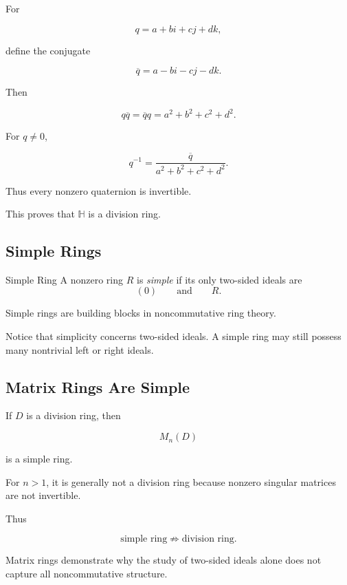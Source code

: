 For

\[ q=a+bi+cj+dk, \]

define the conjugate

\[ \overline q=a-bi-cj-dk. \]

Then

\[ q\overline q=\overline q q=a^2+b^2+c^2+d^2. \]

For \(q\neq0\),

\[ q^{-1}=\frac{\overline q}{a^2+b^2+c^2+d^2}. \]

Thus every nonzero quaternion is invertible.

This proves that \(\mathbb H\) is a division ring.

\subsection{Simple Rings}
\label{subsec:simple-rings}

\begin{definitionbox}{Simple Ring}
A nonzero ring \(R\) is \emph{simple} if its only two-sided ideals are
\[ (0)\qquad\text{and}\qquad R. \]
\end{definitionbox}

Simple rings are building blocks in noncommutative ring theory.

Notice that simplicity concerns two-sided ideals. A simple ring may still
possess many nontrivial left or right ideals.

\subsection{Matrix Rings Are Simple}
\label{subsec:matrix-rings-simple}

If \(D\) is a division ring, then

\[ M_n(D) \]

is a simple ring.

For \(n>1\), it is generally not a division ring because nonzero singular
matrices are not invertible.

Thus

\[ \text{simple ring}\not\Rightarrow\text{division ring}. \]

Matrix rings demonstrate why the study of two-sided ideals alone does not
capture all noncommutative structure.

